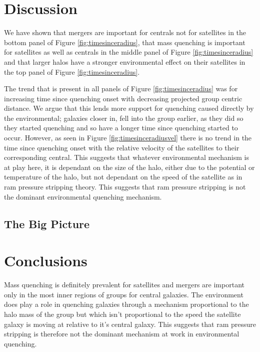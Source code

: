 \documentclass[useAMS,usenatbib]{mn2e}
\begin{document}
\section{Discussion}\label{sec:disc}

We have shown that mergers are important for centrals not for satellites in the bottom panel of Figure \ref{fig:timesinceradius}, that mass quenching is important for satellites as well as centrals in the middle panel of Figure \ref{fig:timesinceradius} and that larger halos have a stronger environmental effect on their satellites in the top panel of Figure \ref{fig:timesinceradius}. 

The trend that is present in all panels of Figure \ref{fig:timesinceradius} was for increasing time since quenching onset with decreasing projected group centric distance. We argue that this lends more support for quenching caused directly by the environmental; galaxies closer in, fell into the group earlier, as they did so they started quenching and so have a longer time since quenching started to occur. However, as seen in Figure \ref{fig:timesinceradiusvel} there is no trend in the time since quenching onset with the relative velocity of the satellites to their corresponding central. This suggests that whatever environmental mechanism is at play here, it is dependant on the size of the halo, either due to the potential or temperature of the halo, but not dependant on the speed of the satellite as in ram pressure stripping theory. This suggests that ram pressure stripping is not the dominant environmental quenching mechanism. 

\subsection{The Big Picture}\label{sec:bigpic}

\section{Conclusions}\label{sec:conc}

Mass quenching is definitely prevalent for satellites and mergers are important only in the most inner regions of groups for central galaxies. The environment does play a role in quenching galaxies through a mechanism proportional to the halo mass of the group but which isn't proportional to the speed the satellite galaxy is moving at relative to it's central galaxy. This suggests that ram pressure stripping is therefore not the dominant mechanism at work in environmental quenching. 




  
\end{document}
